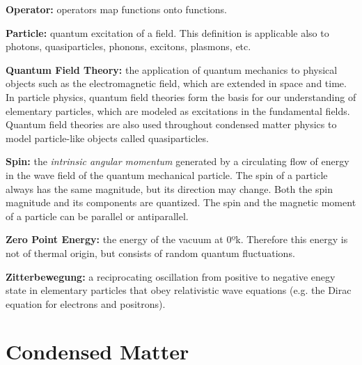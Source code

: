 \begin{list}{}{}
	\item \textbf{Operator:} operators map functions onto functions.
	
	\item \textbf{Particle:} quantum excitation of a field. This definition is applicable also to photons, quasiparticles, phonons, excitons, plasmons, etc.
	
	\item \textbf{Quantum Field Theory:} the application of quantum mechanics to physical objects such as the electromagnetic field, which are extended in space and time. In particle physics, quantum field theories form the basis for our understanding of elementary particles, which are modeled as excitations in the fundamental fields. Quantum field theories are also used throughout condensed matter physics to model particle-like objects called quasiparticles.
	
	\item \textbf{Spin:} the \emph{intrinsic angular momentum} generated by a circulating flow of energy in the wave field of the quantum mechanical particle. The spin of a particle always has the same magnitude, but its direction may change. Both the spin magnitude and its components are quantized. The spin and the magnetic moment of a particle can be parallel or antiparallel.
	
	\item \textbf{Zero Point Energy:} the energy of the vacuum at 0ºk. Therefore this energy is not of thermal origin, but consists of random quantum fluctuations.
	
	\item \textbf{Zitterbewegung:} a reciprocating oscillation from positive to negative enegy state in elementary particles that obey relativistic wave equations (e.g. the Dirac equation for electrons and positrons).
\end{list}
	
	
\section{Condensed Matter}

